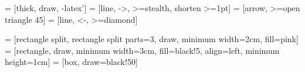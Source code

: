   = [thick, draw, -latex']
 = [line, ->, >=stealth, shorten >=1pt]
 = [arrow, >=open triangle 45]   %
 = [line, <-, >=diamond]           %

 = [rectangle split, rectangle split parts=3, draw, minimum width=2cm, fill=pink] %
 = [rectangle, draw, minimum width=3cm, fill=black!5, align=left, minimum height=1cm]
 = [box, draw=black!50]